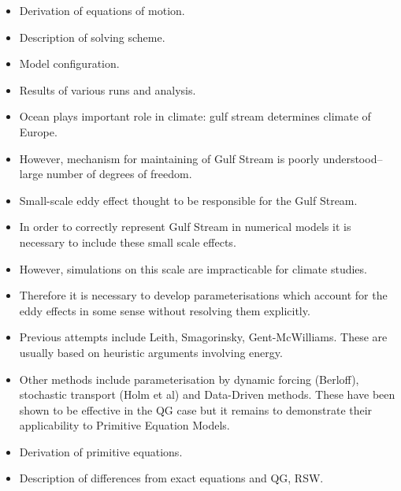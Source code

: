 \begin{itemize}
	\item Derivation of equations of motion.
	\item Description of solving scheme.
	\item Model configuration.
	\item Results of various runs and analysis. 
\end{itemize}

\begin{itemize}
	\item Ocean plays important role in climate: gulf stream determines climate of Europe.
	\item However, mechanism for maintaining of Gulf Stream is poorly understood--large number of degrees of freedom.
	\item Small-scale eddy effect thought to be responsible for the Gulf Stream.
	\item In order to correctly represent Gulf Stream in numerical models it is necessary to include these small scale effects.
	\item However, simulations on this scale are impracticable for climate studies. 
	\item Therefore it is necessary to develop parameterisations which account for the eddy effects in some sense without resolving them explicitly.
	\item Previous attempts include Leith, Smagorinsky, Gent-McWilliams. These are usually based on heuristic arguments involving energy. 
	\item Other methods include parameterisation by dynamic forcing (Berloff), stochastic transport (Holm et al) and Data-Driven methods. These have been shown to be effective in the QG case but it remains to demonstrate their applicability to Primitive Equation Models. 
\end{itemize}

\begin{itemize}
	\item Derivation of primitive equations.	
	\item Description of differences from exact equations and QG, RSW.
\end{itemize}

